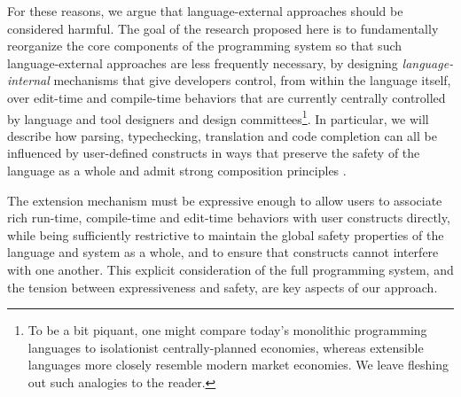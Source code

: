 For these reasons, we argue that language-external approaches should be considered harmful. The goal of the research proposed here is to fundamentally reorganize the core components of the programming system so that such language-external approaches are less frequently necessary, by designing \emph{language-internal} mechanisms that give developers control, from within the language itself, over edit-time and compile-time behaviors that are currently centrally controlled by language and tool designers and design committees\footnote{To be a bit piquant, one might compare today's monolithic programming languages to isolationist {centrally-planned} economies, whereas extensible languages more closely resemble modern market economies. We leave fleshing out such analogies to the reader.}. In particular, we will describe how parsing, typechecking, translation and code completion can all be influenced by user-defined constructs  in ways that preserve the safety of the language as a whole and admit strong composition principles .

The extension mechanism must be expressive enough to allow users to associate rich run-time, compile-time and edit-time behaviors with user constructs directly, while being sufficiently restrictive to maintain the global safety properties of the language and system as a whole, and to ensure that constructs cannot interfere with one another. This explicit consideration of the full programming system, and the tension between expressiveness and safety, are key aspects of our approach.
